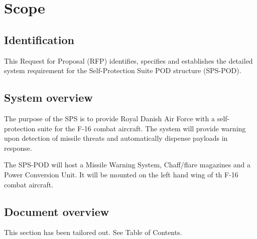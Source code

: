 \documentclass[Main]{subfiles}
\begin{document}
\chapter{Scope}

\section{Identification}
This Request for Proposal (RFP) identifies, specifies and establishes the detailed system requirement for the Self-Protection Suite POD structure (SPS-POD).

\section{System overview}
The purpose of the SPS is to provide Royal Danish Air Force with a self-protection suite for the F-16 combat aircraft. The system will provide warning upon detection of missile threats and automatically dispense payloads in response.

The SPS-POD will host a Missile Warning System, Chaff/flare magazines and a Power Conversion Unit. It will be mounted on the left hand wing of th F-16 combat aircraft.
\section{Document overview}
This section has been tailored out. See Table of Contents.


\end{document}
